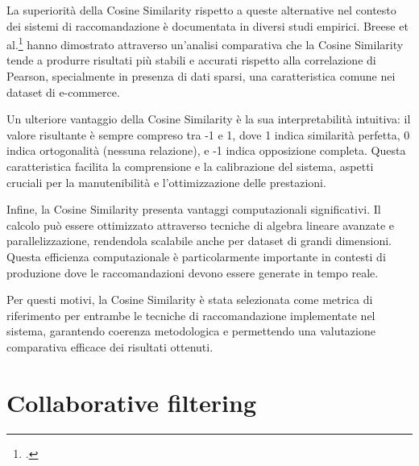 La superiorità della Cosine Similarity rispetto a queste alternative nel contesto dei sistemi di raccomandazione è documentata in diversi studi empirici. Breese et al.\footcite{article:empirical-analysis-predictive-algorithms} hanno dimostrato attraverso un'analisi comparativa che la Cosine Similarity tende a produrre risultati più stabili e accurati rispetto alla correlazione di Pearson, specialmente in presenza di dati sparsi, una caratteristica comune nei dataset di e-commerce.

Un ulteriore vantaggio della Cosine Similarity è la sua interpretabilità intuitiva: il valore risultante è sempre compreso tra -1 e 1, dove 1 indica similarità perfetta, 0 indica ortogonalità (nessuna relazione), e -1 indica opposizione completa. Questa caratteristica facilita la comprensione e la calibrazione del sistema, aspetti cruciali per la manutenibilità e l'ottimizzazione delle prestazioni.

Infine, la Cosine Similarity presenta vantaggi computazionali significativi. Il calcolo può essere ottimizzato attraverso tecniche di algebra lineare avanzate e parallelizzazione, rendendola scalabile anche per dataset di grandi dimensioni. Questa efficienza computazionale è particolarmente importante in contesti di produzione dove le raccomandazioni devono essere generate in tempo reale.

Per questi motivi, la Cosine Similarity è stata selezionata come metrica di riferimento per entrambe le tecniche di raccomandazione implementate nel sistema, garantendo coerenza metodologica e permettendo una valutazione comparativa efficace dei risultati ottenuti.


\section{Collaborative filtering}

